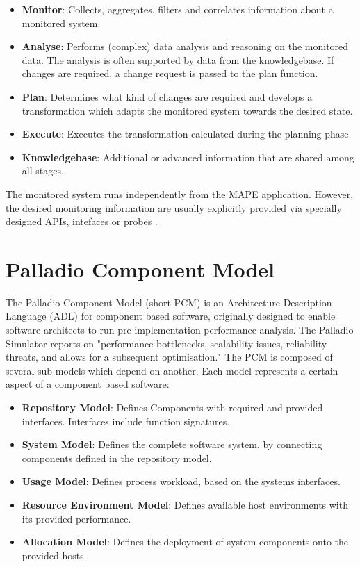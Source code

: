 \begin{itemize}
	\setlength\itemsep{0em}
	\item \textbf{Monitor}: Collects, aggregates, filters and correlates information about a monitored system.
	\item \textbf{Analyse}: Performs (complex) data analysis and reasoning on the monitored data. The analysis is often supported by data from the knowledgebase. If changes are required, a change request is passed to the plan function.
	\item \textbf{Plan}: Determines what kind of changes are required and develops a transformation which adapts the monitored system towards the desired state.
	\item \textbf{Execute}: Executes the transformation calculated during the planning phase.
	\item \textbf{Knowledgebase}: Additional or advanced information that are shared among all stages.
\end{itemize}

The monitored system runs independently from the MAPE application. However, the desired monitoring information are usually explicitly provided via specially designed APIs, intefaces or probes \cite{Dar.2012}.


\section{Palladio Component Model}
\label{sec:Foundations:pcm}

The Palladio Component Model (short PCM) is an Architecture Description Language (ADL) for component based software, originally designed to enable software architects to run pre-implementation performance analysis. The Palladio Simulator reports on "performance bottlenecks, scalability issues, reliability threats, and allows for a subsequent optimisation." The PCM is composed of several sub-models which depend on another. Each model represents a certain aspect of a component based software:

\begin{itemize}
	\setlength\itemsep{0em}
	\item \textbf{Repository Model}: Defines Components with required and provided interfaces. Interfaces include function signatures. 
	\item \textbf{System Model}: Defines the complete software system, by connecting components defined in the repository model.
	\item \textbf{Usage Model}: Defines process workload, based on the systems interfaces.
	\item \textbf{Resource Environment Model}: Defines available host environments with its provided performance.
	\item \textbf{Allocation Model}: Defines the deployment of system components onto the provided hosts.
\end{itemize}

